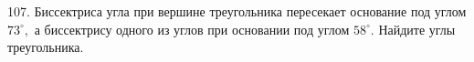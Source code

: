 107. Биссектриса угла при вершине треугольника пересекает основание под углом $73^\circ,$ а биссектрису одного из углов при основании под углом $58^\circ.$ Найдите углы треугольника.\\
